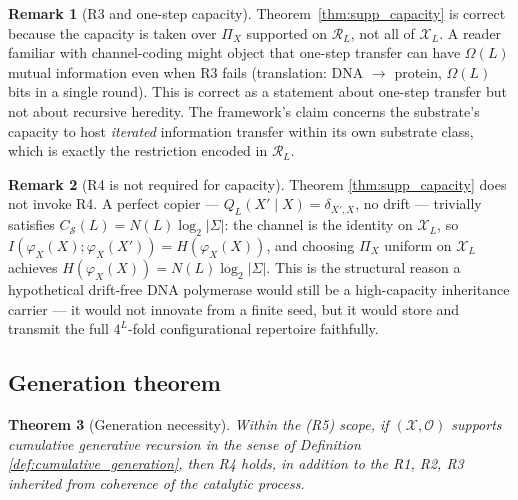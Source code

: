 \documentclass[11pt]{article}
\theoremstyle{plain}
\newtheorem{theorem}{Theorem}
\theoremstyle{definition}
\newtheorem{remark}[theorem]{Remark}
\newcommand{\Csub}{C_{\mathcal{S}}}
\newcommand{\descX}{\varphi_X}
\newcommand{\Xset}{\mathcal{X}}
\newcommand{\Op}{\mathcal{O}}
\begin{document}
\begin{remark}[R3 and one-step capacity]
\label{rem:onestep_vs_recursive}
Theorem~\ref{thm:supp_capacity} is correct because the capacity is taken over $\Pi_X$ supported on $\mathcal{R}_L$, not all of $\Xset_L$. A reader familiar with channel-coding might object that one-step transfer can have $\Omega(L)$ mutual information even when R3 fails (translation: DNA $\to$ protein, $\Omega(L)$ bits in a single round). This is correct as a statement about one-step transfer but not about recursive heredity. The framework's claim concerns the substrate's capacity to host \emph{iterated} information transfer within its own substrate class, which is exactly the restriction encoded in $\mathcal{R}_L$.
\end{remark}

\begin{remark}[R4 is not required for capacity]
\label{rem:no_R4_for_capacity}
Theorem \ref{thm:supp_capacity} does not invoke R4. A perfect copier --- $Q_L(X' \mid X) = \delta_{X', X}$, no drift --- trivially satisfies $\Csub(L) = N(L) \log_2 |\Sigma|$: the channel is the identity on $\Xset_L$, so $I(\descX(X); \descX(X')) = H(\descX(X))$, and choosing $\Pi_X$ uniform on $\Xset_L$ achieves $H(\descX(X)) = N(L) \log_2 |\Sigma|$. This is the structural reason a hypothetical drift-free DNA polymerase would still be a high-capacity inheritance carrier --- it would not innovate from a finite seed, but it would store and transmit the full $4^L$-fold configurational repertoire faithfully.
\end{remark}

\subsection{Generation theorem}
\label{subsec:generation_thm}

\begin{theorem}[Generation necessity]
\label{thm:supp_generation}
Within the (R5) scope, if $(\Xset, \Op)$ supports cumulative generative recursion in the sense of Definition \ref{def:cumulative_generation}, then R4 holds, in addition to the R1, R2, R3 inherited from coherence of the catalytic process.
\end{theorem}
\end{document}
